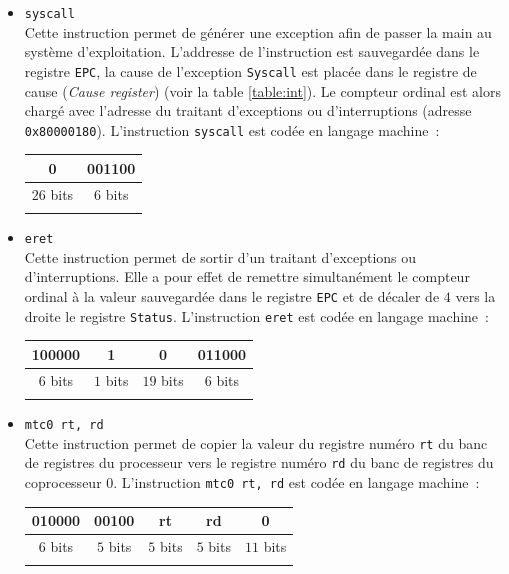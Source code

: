 \documentclass[12pt]{article}
\begin{document}
\begin{itemize}
\item \verb+syscall+\\
Cette instruction permet de générer une exception afin de passer la main au système
d'exploitation. L'addresse de l'instruction est sauvegardée dans le registre \verb+EPC+, la cause de l'exception \verb+Syscall+ est
placée dans le registre de cause (\emph{Cause register}) (voir la table \ref{table:int}).
Le compteur ordinal est alors chargé avec l'adresse du traitant
d'exceptions ou d'interruptions (adresse \verb+0x80000180+).
L'instruction \verb+syscall+ est codée en langage machine~:\\
\begin{center}
\begin{tabular}{cc}
\hline
\multicolumn{1}{|c}{0} & \multicolumn{1}{|c|}{001100}\\
\hline
$26$ bits & $6$ bits\\
&\\
\end{tabular}
\end{center}

\item \verb+eret+\\
Cette instruction permet de sortir d'un traitant d'exceptions ou d'interruptions. Elle a pour effet de remettre simultanément le compteur ordinal à la valeur sauvegardée
dans le registre \verb+EPC+ et de décaler de $4$ vers la droite le registre \verb+Status+.
L'instruction \verb+eret+ est codée en langage machine~:\\
\begin{center}
\begin{tabular}{cccc}
\hline
\multicolumn{1}{|c}{100000} & \multicolumn{1}{|c}{1} & \multicolumn{1}{|c}{0} & \multicolumn{1}{|c|}{011000}\\
\hline
$6$ bits & $1$ bits & $19$ bits & $6$ bits\\
&&&\\
\end{tabular}
\end{center}

\item \verb+mtc0 rt, rd+\\
Cette instruction permet de copier la valeur du registre numéro \verb+rt+ du banc de registres du processeur vers le registre
numéro \verb+rd+ du banc de registres du coprocesseur $0$.
L'instruction \verb+mtc0 rt, rd+ est codée en langage machine~:\\
\begin{center}
\begin{tabular}{ccccc}
\hline
\multicolumn{1}{|c}{010000} & \multicolumn{1}{|c}{00100} & \multicolumn{1}{|c}{rt} & \multicolumn{1}{|c}{rd} & \multicolumn{1}{|c|}{0} \\
\hline
$6$ bits & $5$ bits & $5$ bits & $5$ bits & $11$ bits\\
&&&&\\
\end{tabular}
\end{center}


\end{itemize}
\end{document}
